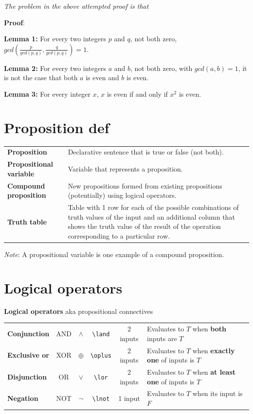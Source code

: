 \documentclass[12pt, oneside]{article}
\begin{document}
{\it The problem in the above attempted proof is that} \underline{\phantom{it only considers one candidate witness
and does not prove that no witnesses exist.}}


{\bf Proof}: 

\vfill

\vfill



{\bf Lemma 1:} For every two integers $p$  and  $q$, not both zero, $gcd\left( \frac{p}{gcd(p,q) },  \frac{q}{gcd(p,q)} \right) =  1$.


{\bf Lemma 2:} For every two integers $a$ and  $b$, not both zero, with  $gcd(a,b) = 1$, it is not the case that both $a$
is  even and $b$ is even.


{\bf Lemma 3:} For every integer  $x$, $x$ is  even if and only if $x^2$  is even.

\vfill \vfill
\section*{Proposition def}


\begin{tabular}{lp{5in}}
    {\bf Proposition} & Declarative sentence that is true or false (not both).\\
    {\bf Propositional variable} & Variable that represents a proposition.\\
    {\bf Compound proposition}& New propositions formed from existing propositions (potentially) using logical operators.\\
    {\bf Truth table}& Table with 1 row for each of the possible combinations of truth values of the input and 
    an additional column that shows the truth value of the result of the operation corresponding to a particular row.
    \end{tabular}
    
    {\it Note}: A propositional variable is one example of a compound proposition. \vfill
\section*{Logical operators}


{\bf Logical operators} aka propositional connectives

\begin{tabular}{lccccp{4in}}
{\bf Conjunction} & AND & $\land$ &\verb|\land| & 2 inputs & Evaluates to $T$ when {\bf both} inputs are $T$\\
{\bf Exclusive or} & XOR & $\oplus$ &\verb|\oplus| & 2 inputs & Evaluates to $T$ when {\bf exactly one} of inputs is $T$\\
{\bf Disjunction} & OR & $\lor$ &\verb|\lor| & 2 inputs & Evaluates to $T$ when {\bf at least one} of inputs is $T$\\
{\bf Negation} & NOT & $\lnot$ &\verb|\lnot| & 1 input & Evaluates to $T$ when its input is $F$\\
\end{tabular} \vfill
\end{document}
